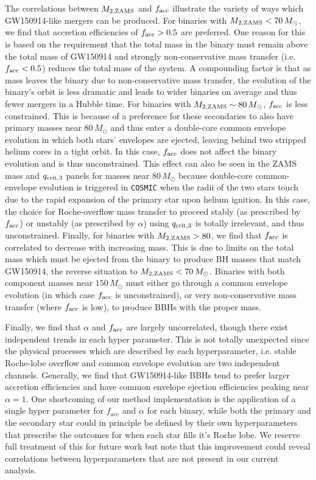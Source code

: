 \documentclass[linenumbers,twocolumn]{aastex631}
\begin{document}
The correlations between $M_{2,\rm{ZAMS}}$ and $f_{\rm acc}$ illustrate the
variety of ways which GW150914-like mergers can be produced. For binaries with
$M_{2,\rm{ZAMS}} < 70\,M_{\odot}$, we find that accretion efficiencies of
$f_{\rm acc} > 0.5$ are preferred. One reason for this is based on the
requirement that the total mass in the binary must remain above the total mass
of GW150914 and strongly non-conservative mass transfer (i.e. $f_{\rm acc} <
0.5$) reduces the total mass of the system. A compounding factor is that as mass
leaves the binary due to non-conservative mass transfer, the evolution of the
binary's orbit is less dramatic and leads to wider binaries on average and thus
fewer mergers in a Hubble time. For binaries with $M_{2,\rm{ZAMS}} \sim
80\,M_{\odot}$, $f_{\rm acc}$ is less constrained. This is because of a
preference for these secondaries to also have primary masses near $
80\,M_{\odot}$ and thus enter a double-core common envelope evolution in which
both stars' envelopes are ejected, leaving behind two stripped helium cores in a
tight orbit. In this case, $f_{\rm acc}$ does not affect the binary evolution
and is thus unconstrained. This effect can also be seen in the ZAMS mass and
$q_{\rm crit, 3}$ panels for masses near $80\,M_{\odot}$ because double-core
common-envelope evolution is triggered in \texttt{COSMIC} when the radii of the
two stars touch due to the rapid expansion of the primary star upon helium
ignition. In this case, the choice for Roche-overflow mass transfer to proceed
stably (as prescribed by $f_{\rm{acc}}$) or unstably (as prescribed by $\alpha$)
using $q_{\rm crit, 3}$ is totally irrelevant, and thus unconstrained. Finally,
for binaries with $M_{2,\rm{ZAMS}} > 80$, we find that $f_{\rm acc}$ is
correlated to decrease with increasing mass. This is due to limits on the total
mass which must be ejected from the binary to produce BH masses that match
GW150914, the reverse situation to $M_{2,\rm{ZAMS}} < 70 \, M_\odot$. Binaries
with both component masses near $150\,M_{\odot}$ must either go through a common
envelope evolution (in which case $f_{\rm acc}$ is unconstrained), or very
non-conservative mass transfer (where $f_{\rm acc}$ is low), to produce BBHs
with the proper mass.

Finally, we find that $\alpha$ and $f_{\rm acc}$ are largely uncorrelated,
though there exist independent trends in each hyper parameter. This is not
totally unexpected since the physical processes which are described by each
hyperparameter, i.e. stable Roche-lobe overflow and common envelope evolution
are two independent channels. Generally, we find that GW150914-like BBHs tend to
prefer larger accretion efficiencies and have common envelope ejection
efficiencies peaking near $\alpha=1$. One shortcoming of our method
implementation is the application of a single hyper parameter for
$f_{\mathrm{acc}}$ and $\alpha$ for each binary, while both the primary and the
secondary star could in principle be defined by their own hyperparameters that
prescribe the outcomes for when each star fills it's Roche lobe. We reserve full
treatment of this for future work but note that this improvement could reveal
correlations between hyperparameters that are not present in our current
analysis.
\end{document}
